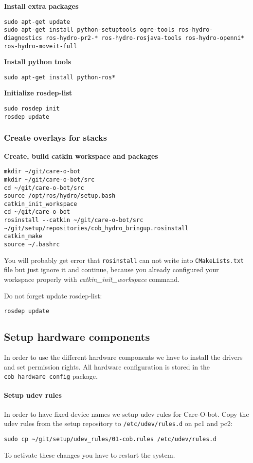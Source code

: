 \textbf{Install extra packages}
\begin{lstlisting}
sudo apt-get update
sudo apt-get install python-setuptools ogre-tools ros-hydro-diagnostics ros-hydro-pr2-* ros-hydro-rosjava-tools ros-hydro-openni* ros-hydro-moveit-full
\end{lstlisting}

\textbf{Install python tools}
\begin{lstlisting}
sudo apt-get install python-ros*
\end{lstlisting}

\textbf{Initialize rosdep-list}
\begin{lstlisting}
sudo rosdep init
rosdep update
\end{lstlisting}

\subsubsection{Create overlays for stacks}
\textbf{Create, build catkin workspace and packages}
\begin{lstlisting}
mkdir ~/git/care-o-bot
mkdir ~/git/care-o-bot/src
cd ~/git/care-o-bot/src
source /opt/ros/hydro/setup.bash
catkin_init_workspace
cd ~/git/care-o-bot
rosinstall --catkin ~/git/care-o-bot/src ~/git/setup/repositories/cob_hydro_bringup.rosinstall
catkin_make
source ~/.bashrc
\end{lstlisting}
You will probably get error that \texttt{rosinstall} can not write into \texttt{CMakeLists.txt} file but just ignore it and continue, because you already configured your workspace properly with \textit{catkin\_init\_workspace} command.

Do not forget update rosdep-list: 
\begin{lstlisting}
rosdep update
\end{lstlisting}

\subsection{Setup hardware components}
In order to use the different hardware components we have to install the drivers and set permission rights. All hardware configuration is stored in the \texttt{cob\_hardware\_config} package.

\paragraph{Setup udev rules}
In order to have fixed device names we setup udev rules for Care-O-bot. Copy the udev rules from the setup repository to \texttt{/etc/udev/rules.d} on pc1 and pc2:
\begin{lstlisting}
sudo cp ~/git/setup/udev_rules/01-cob.rules /etc/udev/rules.d
\end{lstlisting}
To activate these changes you have to restart the system.

